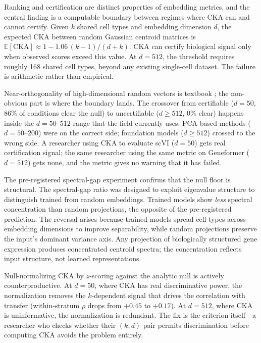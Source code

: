 \documentclass[11pt]{article}
\begin{document}
Ranking and certification are distinct properties of embedding metrics,
and the central finding is a computable boundary between regimes where
CKA can and cannot certify. Given $k$ shared cell types and embedding
dimension $d$, the expected CKA between random Gaussian centroid
matrices is $\mathbb{E}[\mathrm{CKA}] \approx 1 -
1.06\,(k{-}1)/(d{+}k)$. CKA can certify biological signal only when
observed scores exceed this value. At $d = 512$, the threshold requires
roughly 168 shared cell types, beyond any existing single-cell dataset.
The failure is arithmetic rather than empirical.

Near-orthogonality of high-dimensional random vectors is textbook
\citep{johnsonlindenstrauss1984}; the non-obvious part is where the
boundary lands. The crossover from certifiable ($d = 50$, 86\% of
conditions clear the null) to uncertifiable ($d \geq 512$, 0\% clear)
happens inside the $d = 50$--$512$ range that the field currently uses.
PCA-based methods ($d = 50$--$200$) were on the correct side; foundation
models ($d \geq 512$) crossed to the wrong side. A researcher using CKA
to evaluate scVI ($d = 50$) gets real certification signal; the same
researcher using the same metric on Geneformer ($d = 512$) gets none,
and the metric gives no warning that it has failed.

The pre-registered spectral-gap experiment confirms that the null floor
is structural. The spectral-gap ratio was designed to exploit eigenvalue
structure to distinguish trained from random embeddings. Trained models
show \emph{less} spectral concentration than random projections, the
opposite of the pre-registered prediction. The reversal arises because
trained models spread cell types across embedding dimensions to improve
separability, while random projections preserve the input's dominant
variance axis. Any projection of biologically structured gene expression
produces concentrated centroid spectra; the concentration reflects input
structure, not learned representations.

Null-normalizing CKA by $z$-scoring against the analytic null is
actively counterproductive. At $d = 50$, where CKA has real
discriminative power, the normalization removes the $k$-dependent signal
that drives the correlation with transfer (within-stratum $\rho$ drops
from $+0.45$ to $+0.17$). At $d = 512$, where CKA is uninformative,
the normalization is redundant. The fix is the criterion itself---a
researcher who checks whether their $(k, d)$ pair permits discrimination
before computing CKA avoids the problem entirely.
\end{document}
